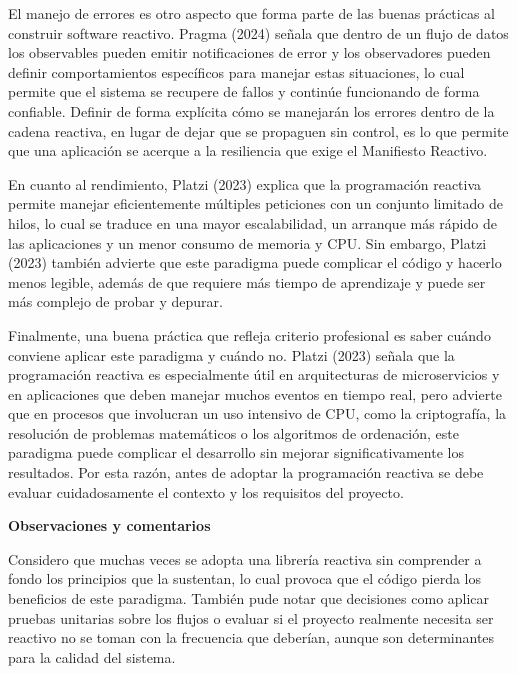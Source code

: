 \documentclass[12pt,letterpaper]{article}
\newcommand{\subtitulo}[1]{\noindent\textbf{#1}\par\vspace{2pt}}
\begin{document}
El manejo de errores es otro aspecto que forma parte de las buenas prácticas al construir software reactivo. Pragma (2024) señala que dentro de un flujo de datos los observables pueden emitir notificaciones de error y los observadores pueden definir comportamientos específicos para manejar estas situaciones, lo cual permite que el sistema se recupere de fallos y continúe funcionando de forma confiable. Definir de forma explícita cómo se manejarán los errores dentro de la cadena reactiva, en lugar de dejar que se propaguen sin control, es lo que permite que una aplicación se acerque a la resiliencia que exige el Manifiesto Reactivo.

En cuanto al rendimiento, Platzi (2023) explica que la programación reactiva permite manejar eficientemente múltiples peticiones con un conjunto limitado de hilos, lo cual se traduce en una mayor escalabilidad, un arranque más rápido de las aplicaciones y un menor consumo de memoria y CPU. Sin embargo, Platzi (2023) también advierte que este paradigma puede complicar el código y hacerlo menos legible, además de que requiere más tiempo de aprendizaje y puede ser más complejo de probar y depurar.

Finalmente, una buena práctica que refleja criterio profesional es saber cuándo conviene aplicar este paradigma y cuándo no. Platzi (2023) señala que la programación reactiva es especialmente útil en arquitecturas de microservicios y en aplicaciones que deben manejar muchos eventos en tiempo real, pero advierte que en procesos que involucran un uso intensivo de CPU, como la criptografía, la resolución de problemas matemáticos o los algoritmos de ordenación, este paradigma puede complicar el desarrollo sin mejorar significativamente los resultados. Por esta razón, antes de adoptar la programación reactiva se debe evaluar cuidadosamente el contexto y los requisitos del proyecto.

\subtitulo{Observaciones y comentarios}
Considero que muchas veces se adopta una librería reactiva sin comprender a fondo los principios que la sustentan, lo cual provoca que el código pierda los beneficios de este paradigma. También pude notar que decisiones como aplicar pruebas unitarias sobre los flujos o evaluar si el proyecto realmente necesita ser reactivo no se toman con la frecuencia que deberían, aunque son determinantes para la calidad del sistema.
\end{document}
